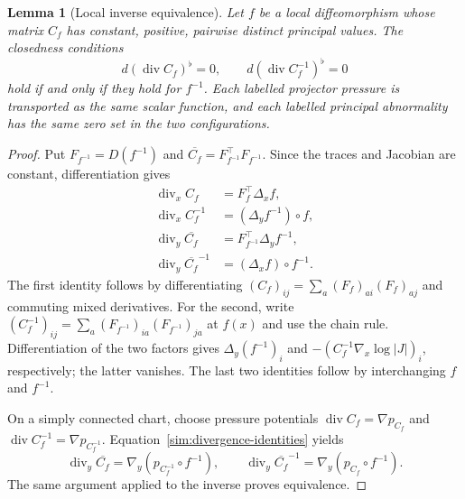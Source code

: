 \documentclass[11pt,a4paper]{article}
\numberwithin{equation}{section}
\theoremstyle{plain}
\newtheorem{lemma}[theorem]{Lemma}
\theoremstyle{definition}
\theoremstyle{remark}
\begin{document}
\begin{lemma}[Local inverse equivalence]\label{sim:inverse}
Let $f$ be a local diffeomorphism whose matrix $C_f$ has constant,
positive, pairwise distinct principal values. The closedness
conditions
\begin{equation}\label{sim:two-pressures}
d(\operatorname{div}C_f)^\flat=0,\qquad
d(\operatorname{div}C_f^{-1})^\flat=0
\end{equation}
hold if and only if they hold for $f^{-1}$. Each labelled projector
pressure is transported as the same scalar function, and each
labelled principal abnormality has the same zero set in the two
configurations.
\end{lemma}
\begin{proof}
Put $F_{f^{-1}}=D(f^{-1})$ and
$\overline{C_f}=F_{f^{-1}}^{\top}F_{f^{-1}}$.
Since the traces and Jacobian are constant, differentiation gives
\begin{equation}\label{sim:divergence-identities}
\begin{aligned}
\operatorname{div}_xC_f&=F_f^{\top}\Delta_xf,\\
\operatorname{div}_xC_f^{-1}&=(\Delta_yf^{-1})\circ f,\\
\operatorname{div}_y\overline{C_f}
&=F_{f^{-1}}^{\top}\Delta_yf^{-1},\\
\operatorname{div}_y\overline{C_f}^{-1}
&=(\Delta_xf)\circ f^{-1}.
\end{aligned}
\end{equation}
The first identity follows by differentiating
$(C_f)_{ij}=\sum_a(F_f)_{ai}(F_f)_{aj}$ and commuting mixed
derivatives. For the second, write
$(C_f^{-1})_{ij}=\sum_a(F_{f^{-1}})_{ia}(F_{f^{-1}})_{ja}$
at $f(x)$ and use the chain rule. Differentiation of the two
factors gives $\Delta_y(f^{-1})_i$ and
$-(C_f^{-1}\nabla_x\log|J|)_i$, respectively; the latter vanishes.
The last two identities follow by interchanging $f$ and $f^{-1}$.

On a simply connected chart, choose pressure potentials
$\operatorname{div}C_f=\nabla p_{C_f}$ and
$\operatorname{div}C_f^{-1}=\nabla p_{C_f^{-1}}$.
Equation~\eqref{sim:divergence-identities} yields
\begin{equation}\label{sim:inversepressures}
\operatorname{div}_y\overline{C_f}
=\nabla_y(p_{C_f^{-1}}\circ f^{-1}),\qquad
\operatorname{div}_y\overline{C_f}^{-1}
=\nabla_y(p_{C_f}\circ f^{-1}).
\end{equation}
The same argument applied to the inverse proves equivalence.


\end{proof}
\end{document}

